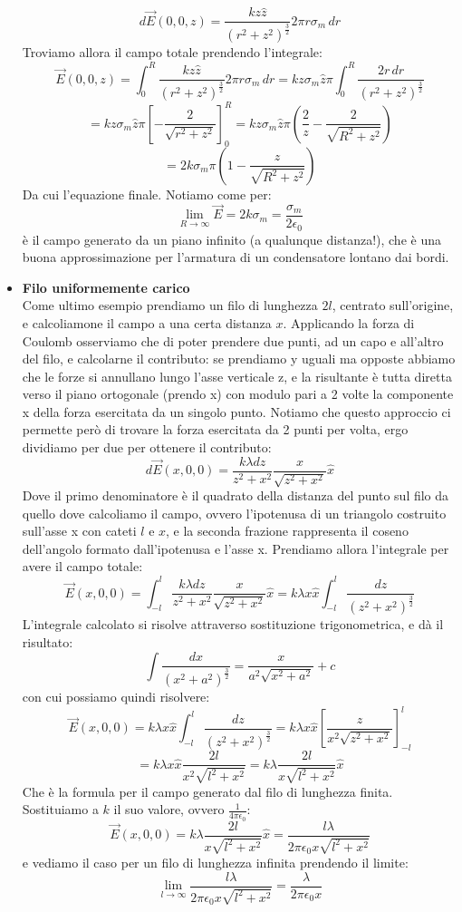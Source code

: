 \documentclass[a4paper,12pt]{article}
\begin{document}
\begin{itemize}
    $$ d\vec{E}(0,0,z) = \frac{kz\hat{z}}{(r^2+z^2)^\frac{3}{2}} 2\pi r\sigma_m \,dr $$
    Troviamo allora il campo totale prendendo l'integrale:
    $$ \vec{E}(0,0,z) = \int_0^R \frac{kz\hat{z}}{(r^2+z^2)^\frac{3}{2}} 2\pi r\sigma_m \,dr = kz\sigma_m\hat{z}\pi \int_0^R \frac{2r\,dr}{(r^2+z^2)^\frac{3}{2}} $$
    $$ = kz\sigma_m\hat{z}\pi \left[ -\frac{2}{\sqrt{r^2+z^2}} \right]_0^R = kz\sigma_m\hat{z}\pi \left(\frac{2}{z} - \frac{2}{\sqrt{R^2 + z^2}}\right) $$
    $$ = 2k\sigma_m\pi\left(1 - \frac{z}{\sqrt{R^2+z^2}}\right) $$
    Da cui l'equazione finale. Notiamo come per:
    $$ \lim_{R\rightarrow \infty} \vec{E} = 2k\sigma_m = \frac{\sigma_m}{2\epsilon_0} $$
    è il campo generato da un piano infinito (a qualunque distanza!), che è una buona approssimazione per l'armatura di un condensatore lontano dai bordi.
  \item \textbf{Filo uniformemente carico} \\
    Come ultimo esempio prendiamo un filo di lunghezza $2l$, centrato sull'origine, e calcoliamone il campo a una certa distanza $x$. Applicando la forza di Coulomb osserviamo che di poter prendere due punti, ad un capo e all'altro del filo,
    e calcolarne il contributo: se prendiamo y uguali ma opposte abbiamo che le forze si annullano lungo l'asse verticale z, e la risultante è tutta diretta verso il piano ortogonale (prendo x) con modulo pari a 2 volte la componente x della forza
    esercitata da un singolo punto. Notiamo che questo approccio ci permette però di trovare la forza esercitata da 2 punti per volta, ergo dividiamo per due per ottenere il contributo:
    $$ d\vec{E}(x,0,0) = \frac{k\lambda dz}{z^2+x^2} \frac{x}{\sqrt{z^2+x^2}}\hat{x} $$
    Dove il primo denominatore è il quadrato della distanza del punto sul filo da quello dove calcoliamo il campo, ovvero l'ipotenusa di un triangolo costruito sull'asse x con cateti $l$ e $x$, e la seconda frazione rappresenta il coseno dell'angolo formato
    dall'ipotenusa e l'asse x. Prendiamo allora l'integrale per avere il campo totale:
    $$ \vec{E}(x,0,0) = \int_{-l}^l \frac{k\lambda dz}{z^2+x^2} \frac{x}{\sqrt{z^2+x^2}}\hat{x} = k\lambda x\hat{x} \int_{-l}^l \frac{dz}{(z^2+x^2)^\frac{3}{2}} $$
    L'integrale calcolato si risolve attraverso sostituzione trigonometrica, e dà il risultato:
    $$ \int \frac{dx}{(x^2+a^2)^{\frac{3}{2}}} = \frac{x}{a^2\sqrt{x^2+a^2}} + c $$
    con cui possiamo quindi risolvere:
    $$ \vec{E}(x,0,0) = k\lambda x\hat{x} \int_{-l}^l \frac{dz}{(z^2+x^2)^\frac{3}{2}} = k\lambda x \hat{x} \left[\frac{z}{x^2\sqrt{z^2+x^2}}\right]_{-l}^l$$
    $$ = k\lambda x\hat{x} \frac{2l}{x^2\sqrt{l^2+x^2}} = k\lambda\frac{2l}{x\sqrt{l^2+x^2}}\hat{x} $$
    Che è la formula per il campo generato dal filo di lunghezza finita. Sostituiamo a $k$ il suo valore, ovvero $\frac{1}{4\pi \epsilon_0}$:
    $$ \vec{E}(x,0,0) = k\lambda\frac{2l}{x\sqrt{l^2+x^2}}\hat{x} = \frac{l\lambda}{2\pi \epsilon_0 x\sqrt{l^2+x^2}} $$
    e vediamo il caso per un filo di lunghezza infinita prendendo il limite:
    $$ \lim_{l\rightarrow\infty} \frac{l\lambda}{2\pi \epsilon_0 x\sqrt{l^2+x^2}} = \frac{\lambda}{2\pi \epsilon_0 x} $$
\end{itemize}
\end{document}
